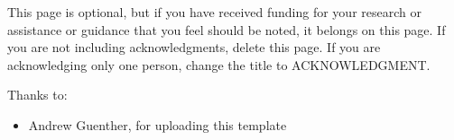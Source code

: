 This page is optional, but if you have received funding for your research or assistance or guidance that you feel should be noted, it belongs on this page. If you are not including acknowledgments, delete this page. If you are acknowledging only one person, change the title to ACKNOWLEDGMENT.

Thanks to:
\begin{itemize}
    \item Andrew Guenther, for uploading this template
\end{itemize}

